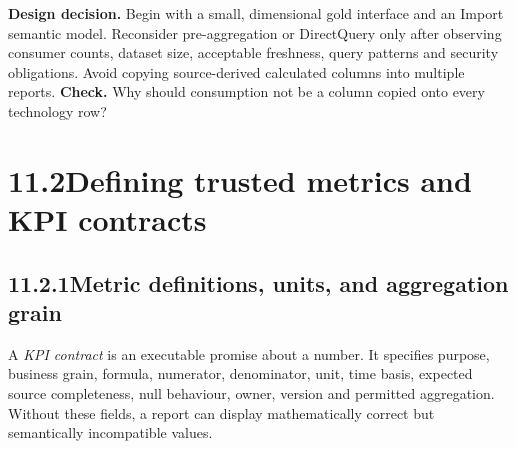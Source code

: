 \documentclass[11pt,twoside]{article}
\newcommand{\topic}[2]{\subsection*{#1\quad #2}}
\begin{document}
\textbf{Design decision.} Begin with a small, dimensional gold interface and an Import semantic model. Reconsider pre-aggregation or DirectQuery only after observing consumer counts, dataset size, acceptable freshness, query patterns and security obligations. Avoid copying source-derived calculated columns into multiple reports.
\textbf{Check.} Why should consumption not be a column copied onto every technology row?
\newpage
\section*{11.2\quad Defining trusted metrics and KPI contracts}
\topic{11.2.1}{Metric definitions, units, and aggregation grain}
A \emph{KPI contract} is an executable promise about a number. It specifies purpose, business grain, formula, numerator, denominator, unit, time basis, expected source completeness, null behaviour, owner, version and permitted aggregation. Without these fields, a report can display mathematically correct but semantically incompatible values.
\end{document}
